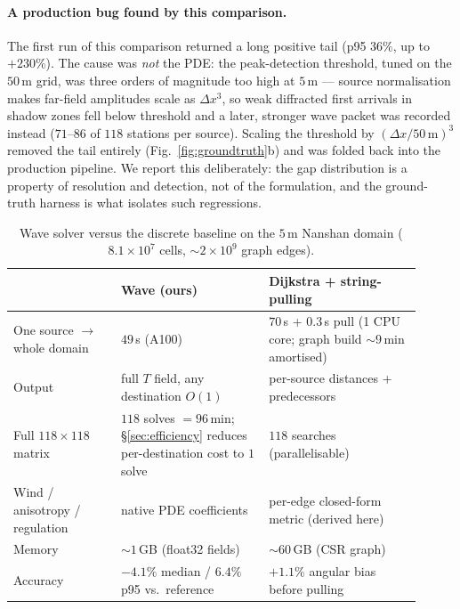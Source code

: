 \paragraph{A production bug found by this comparison.}
The first run of this comparison returned a long positive tail
(p95 $36\%$, up to $+230\%$). The cause was \emph{not} the PDE: the
peak-detection threshold, tuned on the $50\,$m grid, was three orders
of magnitude too high at $5\,$m --- source normalisation makes far-field
amplitudes scale as $\Delta x^3$, so weak diffracted first arrivals
in shadow zones fell below threshold and a later, stronger wave
packet was recorded instead ($71$--$86$ of $118$ stations per source).
Scaling the threshold by $(\Delta x / 50\,\mathrm{m})^3$ removed the
tail entirely (Fig.~\ref{fig:groundtruth}b) and was folded back into
the production pipeline. We report this deliberately: the gap
distribution is a property of resolution and detection, not of the
formulation, and the ground-truth harness is what isolates such
regressions.

\begin{table}[t]
\centering
\caption{Wave solver versus the discrete baseline on the $5\,$m
Nanshan domain ($8.1\times10^7$ cells, ${\sim}2\times10^9$ graph
edges).}
\label{tab:comparison}
\small
\begin{tabular}{p{0.24\linewidth}p{0.33\linewidth}p{0.34\linewidth}}
\toprule
 & Wave (ours) & Dijkstra + string-pulling \\
\midrule
One source $\to$ whole domain & $49\,$s (A100) & $70\,$s + $0.3\,$s pull (1 CPU core; graph build ${\sim}9\,$min amortised) \\
Output & full $T$ field, any destination $O(1)$ & per-source distances + predecessors \\
Full $118\times118$ matrix & $118$ solves $=96\,$min; \S\ref{sec:efficiency} reduces per-destination cost to $1$ solve & $118$ searches (parallelisable) \\
Wind / anisotropy / regulation & native PDE coefficients & per-edge closed-form metric (derived here) \\
Memory & ${\sim}1\,$GB (float32 fields) & ${\sim}60\,$GB (CSR graph) \\
Accuracy & $-4.1\%$ median / $6.4\%$ p95 vs.\ reference & $+1.1\%$ angular bias before pulling \\
\bottomrule
\end{tabular}
\end{table}

